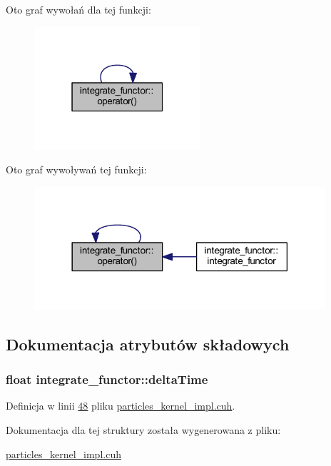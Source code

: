 Oto graf wywołań dla tej funkcji\-:\nopagebreak
\begin{figure}[H]
\begin{center}
\leavevmode
\includegraphics[width=175pt]{structintegrate__functor_a772e86ead8690332beb50911e4448f81_cgraph}
\end{center}
\end{figure}




Oto graf wywoływań tej funkcji\-:\nopagebreak
\begin{figure}[H]
\begin{center}
\leavevmode
\includegraphics[width=306pt]{structintegrate__functor_a772e86ead8690332beb50911e4448f81_icgraph}
\end{center}
\end{figure}




\subsection{Dokumentacja atrybutów składowych}
\hypertarget{structintegrate__functor_a06dce1826719cd5b2a9fdd9f566da754}{
\subsubsection[{delta\-Time}]{\setlength{\rightskip}{0pt plus 5cm}float integrate\-\_\-functor\-::delta\-Time}}\label{structintegrate__functor_a06dce1826719cd5b2a9fdd9f566da754}


Definicja w linii \hyperlink{particles__kernel__impl_8cuh_source_l00048}{48} pliku \hyperlink{particles__kernel__impl_8cuh_source}{particles\-\_\-kernel\-\_\-impl.\-cuh}.



Dokumentacja dla tej struktury została wygenerowana z pliku\-:\begin{DoxyCompactItemize}
\item 
\hyperlink{particles__kernel__impl_8cuh}{particles\-\_\-kernel\-\_\-impl.\-cuh}\end{DoxyCompactItemize}
